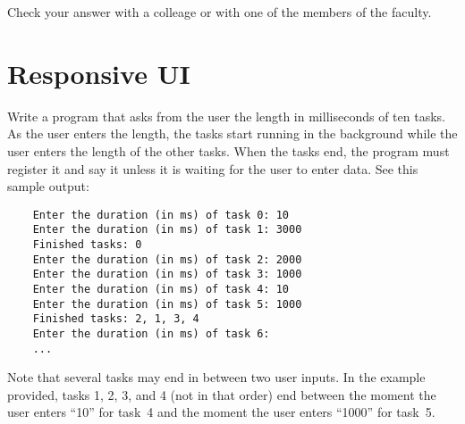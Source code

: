 \documentclass{article}
\begin{document}
Check your answer with a colleage or with one of the members of the
faculty. 




\section{Responsive UI}
\label{sec:responsive-ui}

Write a program that asks from the user the length in milliseconds of
ten tasks. As the user enters the length, the tasks start running in
the background while the user enters the length of the other
tasks. When the tasks end, the program must register it and say it
unless it is waiting for the user to enter data. See this sample
output: 

\begin{verbatim}
    Enter the duration (in ms) of task 0: 10
    Enter the duration (in ms) of task 1: 3000
    Finished tasks: 0
    Enter the duration (in ms) of task 2: 2000
    Enter the duration (in ms) of task 3: 1000
    Enter the duration (in ms) of task 4: 10
    Enter the duration (in ms) of task 5: 1000
    Finished tasks: 2, 1, 3, 4
    Enter the duration (in ms) of task 6: 
    ...
\end{verbatim}

Note that several tasks may end in between two user inputs. In the
example provided, tasks 1, 2, 3, and 4 (not in that order) end
between the moment the user enters ``10'' for task~4 and the moment
the user enters ``1000'' for task~5. 
\end{document}
